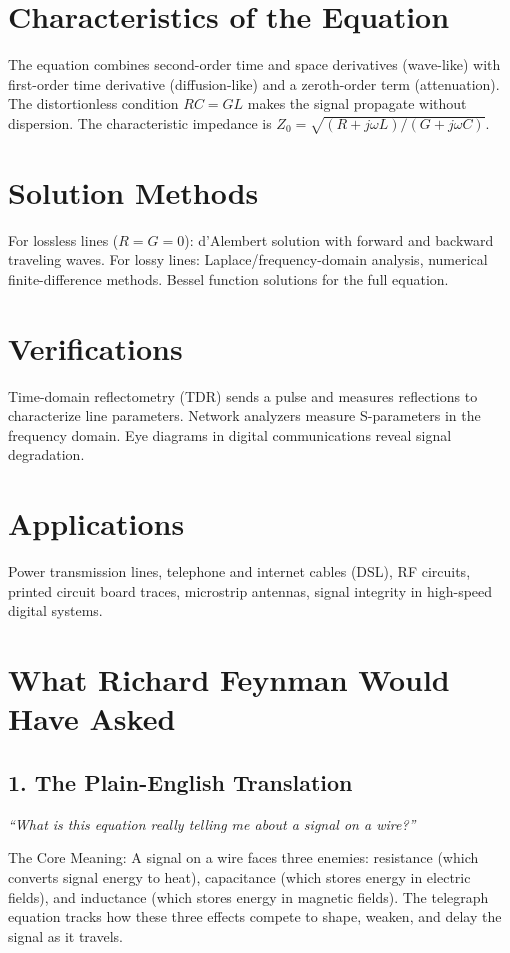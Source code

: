 \section*{Characteristics of the Equation}

The equation combines second-order time and space derivatives (wave-like) with first-order time derivative (diffusion-like) and a zeroth-order term (attenuation). The distortionless condition $RC = GL$ makes the signal propagate without dispersion. The characteristic impedance is $Z_0 = \sqrt{(R + j\omega L)/(G + j\omega C)}$.
\section*{Solution Methods}

For lossless lines ($R = G = 0$): d'Alembert solution with forward and backward traveling waves. For lossy lines: Laplace/frequency-domain analysis, numerical finite-difference methods. Bessel function solutions for the full equation.
\section*{Verifications}

Time-domain reflectometry (TDR) sends a pulse and measures reflections to characterize line parameters. Network analyzers measure S-parameters in the frequency domain. Eye diagrams in digital communications reveal signal degradation.
\section*{Applications}

Power transmission lines, telephone and internet cables (DSL), RF circuits, printed circuit board traces, microstrip antennas, signal integrity in high-speed digital systems.
\section*{What Richard Feynman Would Have Asked}

\subsection*{1. The Plain-English Translation}
\textit{``What is this equation really telling me about a signal on a wire?''}

The Core Meaning: A signal on a wire faces three enemies: resistance (which converts signal energy to heat), capacitance (which stores energy in electric fields), and inductance (which stores energy in magnetic fields). The telegraph equation tracks how these three effects compete to shape, weaken, and delay the signal as it travels.

